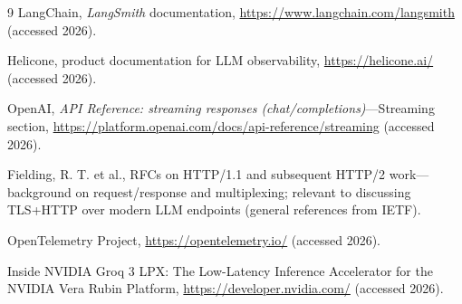 \documentclass[11pt, a4paper]{article}
\begin{document}
\begin{thebibliography}{9}
 LangChain, \emph{LangSmith} documentation, \url{https://www.langchain.com/langsmith} (accessed 2026).

 Helicone, product documentation for LLM observability, \url{https://helicone.ai/} (accessed 2026).

 OpenAI, \emph{API Reference: streaming responses (chat/completions)}---Streaming section, \url{https://platform.openai.com/docs/api-reference/streaming} (accessed 2026).

 Fielding, R. T. et al., RFCs on HTTP/1.1 and subsequent HTTP/2 work---background on request/response and multiplexing; relevant to discussing TLS+HTTP over modern LLM endpoints (general references from IETF).

 OpenTelemetry Project, \url{https://opentelemetry.io/} (accessed 2026).

 Inside NVIDIA Groq 3 LPX: The Low-Latency Inference Accelerator for the NVIDIA Vera Rubin Platform, \href{https://developer.nvidia.com/blog/inside-nvidia-groq-3-lpx-the-low-latency-inference-accelerator-for-the-nvidia-vera-rubin-platform/}{https://developer.nvidia.com/} (accessed 2026).

\end{thebibliography}
\end{document}
